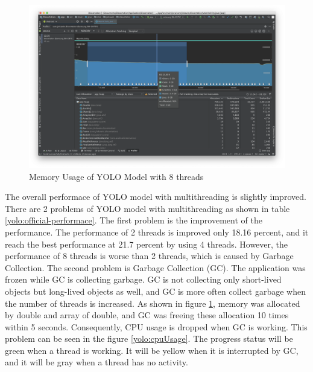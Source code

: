             \begin{figure}[!ht]
                \includegraphics[width=6in]{images/chapter5/gc-problem/gc-collecting.png}
                \caption{Memory Usage of YOLO Model with 8 threads}
                \label{yolo:memoryUsage}
            \end{figure}

            The overall performace of YOLO model with multithreading is slightly improved.
            There are 2 problems of YOLO model with multithreading as shown in table \ref{yolo:official-performace}.
            The first problem is the improvement of the performance.
                The performance of 2 threads is improved only 18.16 percent, and it reach the best performance at 21.7 percent by using 4 threads.
                However, the performance of 8 threads is worse than 2 threads, which is caused by Garbage Collection.
            The second problem is Garbage Collection (GC).
                The application was frozen while GC is collecting garbage.
                GC is not collecting only short-lived objects but long-lived objects as well,
                and GC is more often collect garbage when the number of threads is increased.
                As shown in figure \ref{yolo:memoryUsage}, memory was allocated by double and array of double,
                and GC was freeing these allocation 10 times within 5 seconds.
                Consequently, CPU usage is dropped when GC is working.
                This problem can be seen in the figure \ref{yolo:cpuUsage}.
                The progress status will be green when a thread is working.
                It will be yellow when it is interrupted by GC,
                and it will be gray when a thread has no activity.

